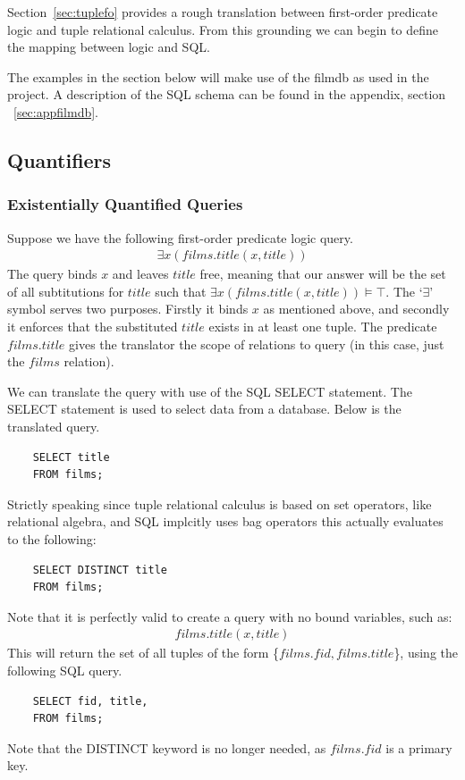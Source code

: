 \documentclass[a4paper, 11pt]{article}
\begin{document}
    Section~\ref{sec:tuplefo} provides a rough translation between
    first-order predicate logic and tuple relational calculus. From this
    grounding we can begin to define the mapping between logic and SQL.

    The examples in the section below will make use of the filmdb as used in
    the project. A description of the SQL schema can be found in the appendix,
    section ~\ref{sec:appfilmdb}.

    \subsection{Quantifiers}

    \subsubsection{Existentially Quantified Queries}

    Suppose we have the following first-order predicate logic query.
    \begin{gather}
      \exists x(films.title(x, title)) \label{select1}
    \end{gather}
    The query binds $x$ and leaves $title$ free, meaning that our
    answer will be the set of all subtitutions for $title$ such that
    $\exists x(films.title(x, title)) \models \top$. The `$\exists$' symbol
    serves two purposes. Firstly it binds $x$ as mentioned above, and secondly
    it enforces that the substituted $title$ exists in at least one tuple.
    The predicate $films.title$ gives the translator the scope of
    relations to query (in this case, just the $films$ relation).

    We can translate the query with use of the SQL SELECT statement. The SELECT
    statement is used to select data from a database\cite{w3SELECT}. Below is
    the translated query.
    \begin{verbatim}
    SELECT title
    FROM films;
    \end{verbatim}
    Strictly speaking since tuple relational calculus is based on set
    operators, like relational algebra, and SQL implcitly uses bag operators
    this actually evaluates to the following:
    \begin{verbatim}
    SELECT DISTINCT title
    FROM films;
    \end{verbatim}
    Note that it is perfectly valid to create a query with no bound variables,
    such as:
    \begin{gather}
      films.title(x, title) \label{select2}
    \end{gather}
    This will return the set of all tuples of the form \{$films.fid,
    films.title$\}, using the following SQL query.
    \begin{verbatim}
    SELECT fid, title,
    FROM films;
    \end{verbatim}
    Note that the DISTINCT keyword is no longer needed, as $films.fid$ is a
    primary key.
\end{document}
